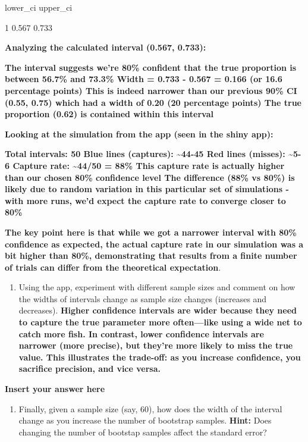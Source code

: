 \documentclass[
]{article}
\providecommand{\tightlist}{%
  \setlength{\itemsep}{0pt}\setlength{\parskip}{0pt}}
\begin{document}
lower\_ci upper\_ci

1 0.567 0.733

\textbf{Analyzing the calculated interval (0.567, 0.733):}

\textbf{The interval suggests we're 80\% confident that the true
proportion is between 56.7\% and 73.3\% Width = 0.733 - 0.567 = 0.166
(or 16.6 percentage points) This is indeed narrower than our previous
90\% CI (0.55, 0.75) which had a width of 0.20 (20 percentage points)
The true proportion (0.62) is contained within this interval}

\textbf{Looking at the simulation from the app (seen in the shiny app):}

\textbf{Total intervals: 50 Blue lines (captures): \textasciitilde44-45
Red lines (misses): \textasciitilde5-6 Capture rate:
\textasciitilde44/50 = 88\% This capture rate is actually higher than
our chosen 80\% confidence level The difference (88\% vs 80\%) is likely
due to random variation in this particular set of simulations - with
more runs, we'd expect the capture rate to converge closer to 80\%}

\textbf{The key point here is that while we got a narrower interval with
80\% confidence as expected, the actual capture rate in our simulation
was a bit higher than 80\%, demonstrating that results from a finite
number of trials can differ from the theoretical expectation}.

\begin{enumerate}
\def\labelenumi{\arabic{enumi}.}
\tightlist
\item
  Using the app, experiment with different sample sizes and comment on
  how the widths of intervals change as sample size changes (increases
  and decreases). \textbf{Higher confidence intervals are wider because
  they need to capture the true parameter more often---like using a wide
  net to catch more fish. In contrast, lower confidence intervals are
  narrower (more precise), but they're more likely to miss the true
  value. This illustrates the trade-off: as you increase confidence, you
  sacrifice precision, and vice versa.}
\end{enumerate}

\textbf{Insert your answer here}

\begin{enumerate}
\def\labelenumi{\arabic{enumi}.}
\tightlist
\item
  Finally, given a sample size (say, 60), how does the width of the
  interval change as you increase the number of bootstrap samples.
  \textbf{Hint:} Does changing the number of bootstap samples affect the
  standard error?
\end{enumerate}
\end{document}
